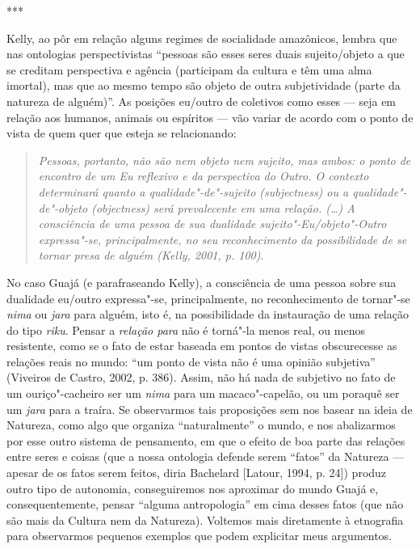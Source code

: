 \begin{center}
***
\end{center}

Kelly, ao pôr em relação alguns regimes de socialidade amazônicos,
lembra que nas ontologias perspectivistas ``pessoas são esses seres duais
sujeito/objeto a que se creditam perspectiva e agência (participam da
cultura e têm uma alma imortal), mas que ao mesmo tempo são objeto de
outra subjetividade (parte da natureza de alguém)''. As posições eu/outro
de coletivos como esses --- seja em relação aos humanos, animais ou
espíritos --- vão variar de acordo com o ponto de vista de quem quer que
esteja se relacionando:

\begin{quote}
\emph{Pessoas, portanto, não são nem objeto nem sujeito, mas ambos: o ponto
 de encontro de um Eu reflexivo e da perspectiva do Outro. O contexto
 determinará quanto a qualidade"-de"-sujeito (\emph{subjectness}) ou a
 qualidade"-de"-objeto (\emph{objectness}) será prevalecente em uma
 relação. (\ldots{}) A consciência de uma pessoa de sua
dualidade sujeito"-Eu/objeto"-Outro expressa"-se, principalmente, no seu
reconhecimento da possibilidade de se tornar presa de alguém (Kelly, 2001, p. 100)}.
\end{quote}

No caso Guajá (e parafraseando Kelly), a consciência de uma pessoa sobre
sua dualidade eu/outro expressa"-se, principalmente, no reconhecimento de
tornar"-se \emph{nima} ou \emph{jara} para alguém, isto é, na
possibilidade da instauração de uma relação do tipo \emph{riku}. Pensar
a \emph{relação para} não é torná"-la menos real, ou menos resistente,
como se o fato de estar baseada em pontos de vistas obscurecesse as
relações reais no mundo: ``um ponto de vista não é uma opinião subjetiva''
(Viveiros de Castro, 2002, p. 386). Assim, não há nada de subjetivo no
fato de um ouriço"-cacheiro ser um \emph{nima} para um macaco"-capelão, ou
um poraquê ser um \emph{jara} para a traíra. Se observarmos tais
proposições sem nos basear na ideia de Natureza, como algo que organiza
``naturalmente'' o mundo, e nos abalizarmos por esse outro sistema de
pensamento, em que o efeito de boa parte das relações entre seres e
coisas (que a nossa ontologia defende serem ``fatos'' da Natureza ---
apesar de os fatos serem feitos, diria Bachelard {[}Latour, 1994,
p. 24{]}) produz outro tipo de autonomia, conseguiremos nos aproximar do
mundo Guajá e, consequentemente, pensar ``alguma antropologia'' em cima
desses fatos (que não são mais da Cultura nem da Natureza). Voltemos
mais diretamente à etnografia para observarmos pequenos exemplos que
podem explicitar meus argumentos.

